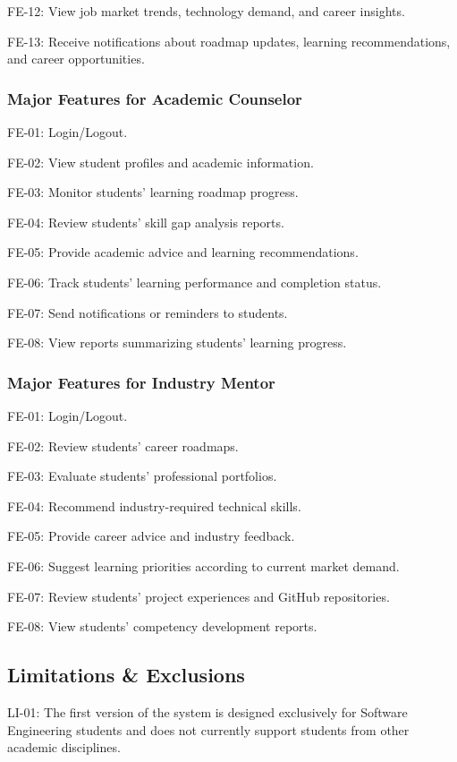 FE-12: View job market trends, technology demand, and career insights. 

FE-13: Receive notifications about roadmap updates, learning recommendations, and career opportunities. 

\subsubsection{Major Features for Academic Counselor}

FE-01: Login/Logout. 

FE-02: View student profiles and academic information. 

FE-03: Monitor students’ learning roadmap progress. 

FE-04: Review students’ skill gap analysis reports. 

FE-05: Provide academic advice and learning recommendations. 

FE-06: Track students’ learning performance and completion status. 

FE-07: Send notifications or reminders to students. 

FE-08: View reports summarizing students’ learning progress. 

\subsubsection{Major Features for Industry Mentor}

FE-01: Login/Logout. 

FE-02: Review students’ career roadmaps. 

FE-03: Evaluate students’ professional portfolios. 

FE-04: Recommend industry-required technical skills. 

FE-05: Provide career advice and industry feedback. 

FE-06: Suggest learning priorities according to current market demand. 

FE-07: Review students’ project experiences and GitHub repositories. 

FE-08: View students’ competency development reports. 

\subsection{Limitations \& Exclusions}
LI-01: The first version of the system is designed exclusively for Software Engineering students and does not currently support students from other academic disciplines. 

